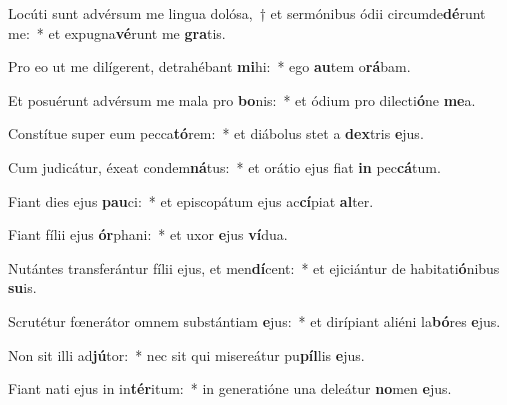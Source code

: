 \item Locúti sunt advérsum me lingua dolósa,~† et sermónibus ódii circumde\textbf{dé}runt me:~* et expugna\textbf{vé}runt me \textbf{gra}tis.
\item Pro eo ut me dilígerent, detrahébant \textbf{mi}hi:~* ego \textbf{au}tem o\textbf{rá}bam.
\item Et posuérunt advérsum me mala pro \textbf{bo}nis:~* et ódium pro dilecti\textbf{ó}ne \textbf{me}a.
\item Constítue super eum pecca\textbf{tó}rem:~* et diábolus stet a \textbf{dex}tris \textbf{e}jus.
\item Cum judicátur, éxeat condem\textbf{ná}tus:~* et orátio ejus fiat \textbf{in} pec\textbf{cá}tum.
\item Fiant dies ejus \textbf{pau}ci:~* et episcopátum ejus ac\textbf{cí}piat \textbf{al}ter.
\item Fiant fílii ejus \textbf{ór}phani:~* et uxor \textbf{e}jus \textbf{ví}dua.
\item Nutántes transferántur fílii ejus, et men\textbf{dí}cent:~* et ejiciántur de habitati\textbf{ó}nibus \textbf{su}is.
\item Scrutétur fœnerátor omnem substántiam \textbf{e}jus:~* et dirípiant aliéni la\textbf{bó}res \textbf{e}jus.
\item Non sit illi ad\textbf{jú}tor:~* nec sit qui misereátur pu\textbf{píl}lis \textbf{e}jus.
\item Fiant nati ejus in in\textbf{tér}itum:~* in generatióne una deleátur \textbf{no}men \textbf{e}jus.
